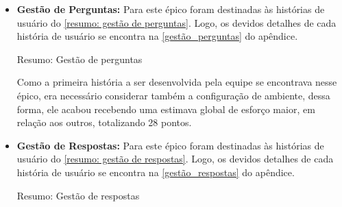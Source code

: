 \begin{itemize}
\item {\textbf{Gestão de Perguntas:}} Para este épico foram destinadas às histórias de usuário do \autoref{resumo: gestão de perguntas}. Logo, os devidos detalhes de cada história de usuário se encontra na \autoref{gestão_perguntas} do apêndice.

\def\arraystretch{2}
\begin{quadro}[htb]
\centering
\ABNTEXfontereduzida
\caption{Resumo: Gestão de perguntas}
\label{resumo: gestão de perguntas}
\end{quadro}
\FloatBarrier 

Como a primeira história a ser desenvolvida pela equipe se encontrava nesse épico, era necessário considerar também a configuração de ambiente, dessa forma, ele acabou recebendo uma estimava global de esforço maior, em relação aos outros, totalizando 28 pontos.

\item {\textbf{Gestão de Respostas:}} Para este épico foram destinadas às histórias de usuário do \autoref{resumo: gestão de respostas}. Logo, os devidos detalhes de cada história de usuário se encontra na \autoref{gestão_respostas} do apêndice.

\def\arraystretch{2}
\begin{quadro}[htb]
\centering
\ABNTEXfontereduzida
\caption{Resumo: Gestão de respostas}
\label{resumo: gestão de respostas}
\end{quadro}
\end{itemize}
